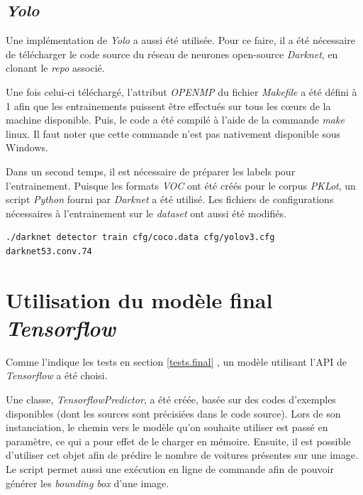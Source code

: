 \subsection{\textit{Yolo}}
Une implémentation de \textit{Yolo} a aussi été utilisée. Pour ce faire, il a été nécessaire de télécharger le code source du réseau de neurones open-source \textit{Darknet}\autocite{lib:yolo}, en clonant le \textit{repo} associé.

Une fois celui-ci téléchargé, l'attribut \textit{OPENMP} du fichier \textit{Makefile} a été défini à 1 afin que les entrainements puissent être effectués sur tous les cœurs de la machine disponible. Puis, le code a été compilé à l'aide de la commande \textit{make} linux. Il faut noter que cette commande n'est pas nativement disponible sous Windows.

Dans un second temps, il est nécessaire de préparer les labels pour l'entrainement. Puisque les formats \textit{VOC} ont été créés pour le corpus \textit{PKLot}, un script \textit{Python} fourni par \textit{Darknet} a été utilisé. Les fichiers de configurations nécessaires à l'entrainement sur le \textit{dataset} ont aussi été modifiés. 

\begin{lstlisting}[caption={Exécution d'un entrainement à l'aide de \textit{Yolo}}, label={lst:yolo_train}, numbers=none] 
./darknet detector train cfg/coco.data cfg/yolov3.cfg darknet53.conv.74
\end{lstlisting}


\section{Utilisation du modèle final \textit{Tensorflow}} 
Comme l'indique les tests en section \ref{tests.final} , un modèle utilisant l'API de \textit{Tensorflow} a été choisi. 

Une classe, \textit{TensorflowPredictor}, a été créée, basée sur des codes d'exemples disponibles (dont les sources sont précisiées dans le code source). Lors de son instanciation, le chemin vers le modèle qu'on souhaite utiliser est passé en paramètre, ce qui a pour effet de le charger en mémoire. Ensuite, il est possible d'utiliser cet objet afin de prédire le nombre de voitures présentes sur une image. Le script permet aussi une exécution en ligne de commande afin de pouvoir générer les \textit{bounding box} d'une image.




